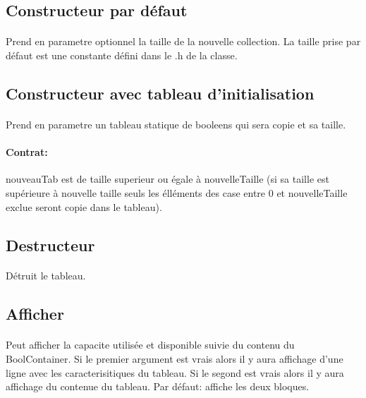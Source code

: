 \documentclass[a4paper, 12pts]{article}
\begin{document}
\subsection{Constructeur par défaut}

\paragraph{}
Prend en parametre optionnel la taille de la nouvelle collection. La taille prise par défaut est une constante défini dans le .h de la classe.

\subsection{Constructeur avec tableau d'initialisation}

\paragraph{}
Prend en parametre un tableau statique de booleens qui sera copie et sa taille.
\paragraph{Contrat:}
nouveauTab est de taille superieur ou égale à nouvelleTaille (si sa taille est supérieure à nouvelle taille seuls les élléments des case entre 0 et nouvelleTaille exclue seront copie dans le tableau).

\subsection{Destructeur}

\paragraph{}
Détruit le tableau.

\subsection{Afficher}

\paragraph{}
Peut afficher la capacite utilisée et disponible suivie du contenu du BoolContainer. Si le premier argument est vrais alors il y aura affichage d'une ligne avec les caracterisitiques du tableau. Si le segond est vrais alors il y aura affichage du contenue du tableau. Par défaut: affiche les deux bloques.
\end{document}
